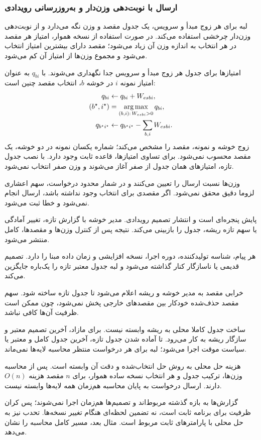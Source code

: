 \subsubsection{ارسال با نوبت‌دهی وزن‌دار و به‌روزرسانی رویدادی}

لبه برای هر زوج مبدأ و سرویس، یک جدول مقصد و وزن نگه می‌دارد و از نوبت‌دهی وزن‌دار چرخشی  استفاده می‌کند. در صورت استفاده از نسخه هموار، امتیاز هر مقصد در هر انتخاب به اندازه وزن آن زیاد می‌شود؛ مقصد دارای بیشترین امتیاز انتخاب می‌شود و مجموع وزن‌ها از امتیاز آن کم می‌شود.

امتیازها برای جدول هر زوج مبدأ و سرویس جدا نگهداری می‌شوند. با $q_{bi}$ به عنوان امتیاز نمونه $i$ در خوشه $b$، انتخاب مقصد چنین است:
\begin{equation}
\begin{aligned}
 q_{bi}&\gets q_{bi}+W_{esbi},\\
 (b^\star,i^\star)&=\operatorname*{arg\,max}_{(b,i):\,W_{esbi}>0}q_{bi},\\
 q_{b^\star i^\star}&\gets q_{b^\star i^\star}-\sum_{b,i}W_{esbi}.
\end{aligned}
 \label{eq:wrr}
\end{equation}
زوج خوشه و نمونه، مقصد را مشخص می‌کند؛ شماره یکسان نمونه در دو خوشه، یک مقصد محسوب نمی‌شود. برای تساوی امتیازها، قاعده ثابت وجود دارد. با نصب جدول تازه، امتیازهای همان جدول از صفر آغاز می‌شوند و وزن صفر انتخاب نمی‌شود.

وزن‌ها نسبت ارسال را تعیین می‌کنند و در شمار محدود درخواست، سهم اعشاری لزوما دقیق محقق نمی‌شود. اگر مقصدی برای انتخاب وجود نداشته باشد، ارسال انجام نمی‌شود و خطا ثبت می‌شود.

پایش پنجره‌ای است و انتشار تصمیم رویدادی. مدیر خوشه با گزارش تازه، تغییر آمادگی یا سهم تازه ریشه، جدول را بازبینی می‌کند. نتیجه پس از کنترل وزن‌ها و مقصدها، کامل منتشر می‌شود.

هر پیام، شناسه تولیدکننده، دوره اجرا، نسخه افزایشی و زمان داده مبنا را دارد. تصمیم قدیمی یا ناسازگار کنار گذاشته می‌شود و لبه جدول معتبر تازه را یک‌باره جایگزین می‌کند.

خرابی مقصد به مدیر خوشه و ریشه اعلام می‌شود تا جدول تازه ساخته شود. سهم مقصد حذف‌شده خودکار بین مقصدهای خارجی پخش نمی‌شود، چون ممکن است ظرفیت آن‌ها کافی نباشد.

ساخت جدول کاملا محلی به ریشه وابسته نیست. برای مازاد، آخرین تصمیم معتبر و سازگار ریشه به کار می‌رود. تا آماده شدن جدول تازه، آخرین جدول کامل و معتبر یا سیاست موقت اجرا می‌شود؛ لبه برای هر درخواست منتظر محاسبه لایه‌ها نمی‌ماند.

هزینه حل محلی به روش حل انتخاب‌شده و دقت آن وابسته است. پس از محاسبه وزن‌ها، ترکیب جدول و هر انتخاب نسخه ساده هموار، برای $n$ مقصد هزینه $O(n)$ دارند. ارسال درخواست به پایان محاسبه هم‌زمان همه لایه‌ها وابسته نیست.

گزارش‌ها به بازه گذشته مربوط‌اند و تصمیم‌ها هم‌زمان اجرا نمی‌شوند؛ پس کران ظرفیت برای برنامه ثابت است، نه تضمین لحظه‌ای هنگام تغییر نسخه‌ها. تحدب نیز به حل محلی با پارامترهای ثابت مربوط است. مثال بعد، مسیر کامل محاسبه را نشان می‌دهد.
